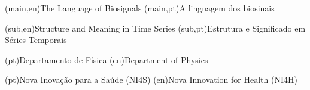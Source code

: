 
%


\nttitle(main,en){The Language of Biosignals}%
\nttitle(main,pt){A linguagem dos biosinais}%

\nttitle(sub,en){Structure and Meaning in Time Series}%
\nttitle(sub,pt){Estrutura e Significado em Séries Temporais}%


\ntdepartment*(pt){Departamento de Física}
\ntdepartment*(en){Department of Physics}

\ntdegreename*(pt){Nova Inovação para a Saúde (NI4S)}
\ntdegreename*(en){Nova Innovation for Health (NI4H)}

